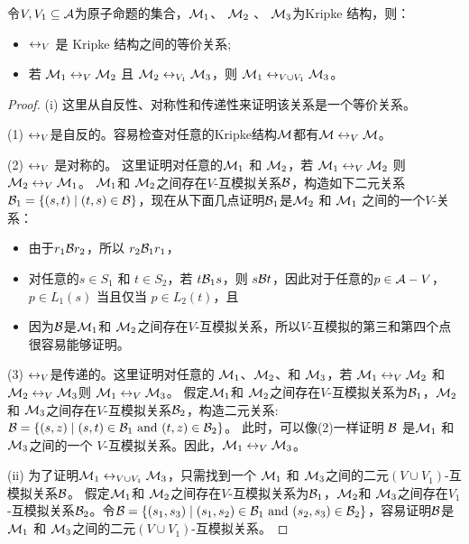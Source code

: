\begin{proposition} \label{pro:EqUnion}
	令$V, V_1 \subseteq {\cal A}$为原子命题的集合，${\cal M}_1$、 ${\cal M}_2$ 、 ${\cal M}_3$为Kripke 结构，则：
	\begin{itemize} 
		\item[(i)] $\leftrightarrow_V$ 是 Kripke 结构之间的等价关系;
		\item[(ii)] 若 ${\cal M}_1 \leftrightarrow_V {\cal M}_2$ 且 ${\cal M}_2 \leftrightarrow_{V_1} {\cal M}_3$，则 ${\cal M}_1 \leftrightarrow_{V \cup V_1} {\cal M}_3$。
	\end{itemize}
	
\end{proposition}
\begin{proof}
	(i) 这里从自反性、对称性和传递性来证明该关系是一个等价关系。
	
	(1) $\leftrightarrow_V$是自反的。容易检查对任意的Kripke结构${\cal M}$都有${\cal M}\leftrightarrow_V {\cal M}$。
	
	(2) $\leftrightarrow_V$ 是对称的。 这里证明对任意的${\cal M}_1$ 和 ${\cal M}_2$，若 ${\cal M}_1 \leftrightarrow_V {\cal M}_2$ 则 ${\cal M}_2 \leftrightarrow_V {\cal M}_1$。
	${\cal M}_1$和 ${\cal M}_2$之间存在$V$-互模拟关系${\cal B}$，构造如下二元关系${\cal B}_1=\{(s,t) \mid (t, s)\in {\cal B}\}$，现在从下面几点证明${\cal B}_1$是${\cal M}_2$ 和 ${\cal M}_1$ 之间的一个$V$-关系：
	\begin{itemize}
		\item 由于$r_1 {\cal B} r_2$，所以 $r_2 {\cal B}_1 r_1$，
		\item 对任意的$s\in S_1$ 和 $t\in S_2$，若 $t {\cal B}_1 s$，则 $s{\cal B} t$，因此对于任意的$p \in {\cal A} - V$，$p \in L_1(s)$ 当且仅当 $p \in L_2(t)$，且
		\item 因为${\cal B}$是${\cal M}_1$和 ${\cal M}_2$之间存在$V$-互模拟关系，所以$V$-互模拟的第三和第四个点很容易能够证明。
	\end{itemize}
	
	(3) $\leftrightarrow_V$是传递的。这里证明对任意的 ${\cal M}_1$、${\cal M}_2$、和 ${\cal M}_3$，若 ${\cal M}_1 \leftrightarrow_V {\cal M}_2$ 和 ${\cal M}_2 \leftrightarrow_V {\cal M}_3$则 ${\cal M}_1 \leftrightarrow_V {\cal M}_3$。 假定${\cal M}_1$和 ${\cal M}_2$之间存在$V$-互模拟关系为${\cal B}_1$，${\cal M}_2$和 ${\cal M}_3$之间存在$V$-互模拟关系${\cal B}_2$，构造二元关系: ${\cal B}=\{(s, z) \mid (s,t) \in {\cal B}_1\ \mbox{and}\ (t, z)\in {\cal B}_2\}$。
	此时，可以像(2)一样证明 ${\cal B}$ 是${\cal M}_1$ 和 ${\cal M}_3$之间的一个 $V$-互模拟关系。因此，${\cal M}_1 \leftrightarrow_V {\cal M}_3$。
	
	(ii) 为了证明${\cal M}_1 \leftrightarrow_{V\cup V_1} {\cal M}_3$，只需找到一个  ${\cal M}_1$ 和 ${\cal M}_3$之间的二元$(V\cup V_1)$-互模拟关系${\cal B}$。
	假定${\cal M}_1$和 ${\cal M}_2$之间存在$V$-互模拟关系为${\cal B}_1$，${\cal M}_2$和 ${\cal M}_3$之间存在$V_1$-互模拟关系${\cal B}_2$。令${\cal B} = \{(s_1, s_3)\mid (s_1, s_2) \in {\cal B}_1\ \mbox{and} \ (s_2, s_3) \in {\cal B}_2\}$，容易证明${\cal B}$是${\cal M}_1$ 和 ${\cal M}_3$之间的二元$(V\cup V_1)$-互模拟关系。
	
\end{proof}

